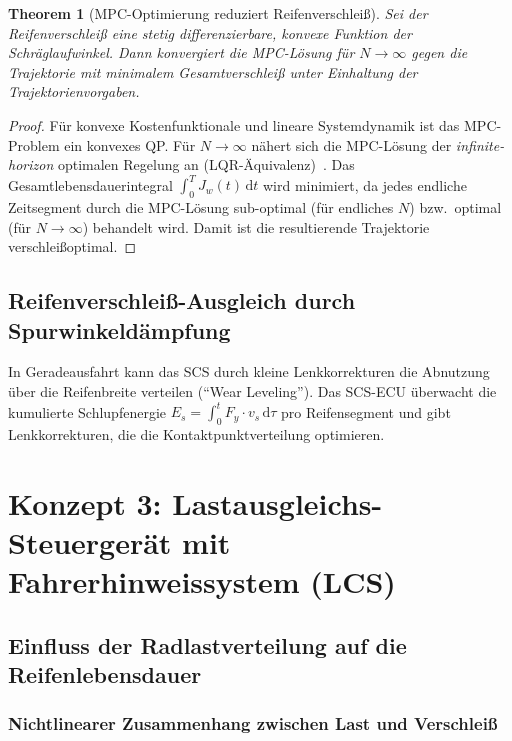 ﻿\documentclass[12pt,a4paper]{article}
\newtheorem{theorem}{Theorem}[section]
\theoremstyle{definition}
\theoremstyle{remark}
\begin{document}
\begin{theorem}[MPC-Optimierung reduziert Reifenverschleiß]
\label{thm:mpc_wear}
Sei der Reifenverschleiß eine stetig differenzierbare, konvexe Funktion der
Schräglaufwinkel. Dann konvergiert die MPC-Lösung für $N \to \infty$ gegen
die Trajektorie mit minimalem Gesamtverschleiß unter Einhaltung der
Trajektorienvorgaben.
\end{theorem}

\begin{proof}
Für konvexe Kostenfunktionale und lineare Systemdynamik ist das MPC-Problem
ein konvexes QP. Für $N \to \infty$ nähert sich die MPC-Lösung der
\emph{infinite-horizon} optimalen Regelung an (LQR-Äquivalenz)~\cite{Mayne2000}.
Das Gesamtlebensdauerintegral $\int_0^T J_w(t)\,\mathrm{d}t$ wird minimiert,
da jedes endliche Zeitsegment durch die MPC-Lösung sub-optimal (für endliches $N$)
bzw.\ optimal (für $N \to \infty$) behandelt wird. Damit ist die resultierende
Trajektorie verschleißoptimal.
\end{proof}

\subsection{Reifenverschleiß-Ausgleich durch Spurwinkeldämpfung}

In Geradeausfahrt kann das SCS durch kleine Lenkkorrekturen die Abnutzung
über die Reifenbreite verteilen (``Wear Leveling''). Das SCS-ECU überwacht
die kumulierte Schlupfenergie $E_s = \int_0^t F_y \cdot v_s \,\mathrm{d}\tau$
pro Reifensegment und gibt Lenkkorrekturen, die die Kontaktpunktverteilung
optimieren.

\section{Konzept 3: Lastausgleichs-Steuergerät mit Fahrerhinweissystem (LCS)}
\label{sec:lcs}

\subsection{Einfluss der Radlastverteilung auf die Reifenlebensdauer}

\subsubsection{Nichtlinearer Zusammenhang zwischen Last und Verschleiß}
\end{document}
